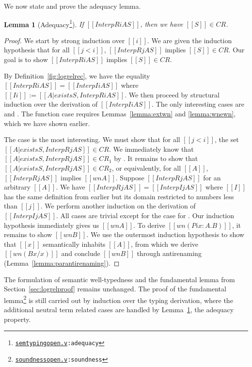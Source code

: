 \documentclass[\ifpublic nolinenum\else\fi,online,OA]{jfp}
\newcommand{\dotv}[2]{\href{#1}{\texttt{#1}}{\texttt{:#2}}}
\newtheorem{lemma}[theorem]{Lemma}
\theoremstyle{definition}
\begin{document}
We now state and prove the adequacy lemma.
\begin{lemma}[Adequacy\footnote{\dotv{semtypingopen.v}{adequacy}}]
  \label{lemma:adequacy}
  If $[[InterpR i A S]]$, then we have $[[S]] \in CR$.
\end{lemma}
\begin{proof}
  We start by strong induction over $[[i]]$. We are given the
  induction hypothesis that for all $[[j < i]]$, $[[InterpR j A S]]$
  implies $[[S]] \in CR$. Our goal is to show $[[InterpR i A S]]$
  implies $[[S]] \in CR$.

  By Definition~\ref{fig:logrelrec}, we have the
  equality $[[InterpR i A S]] = [[Interp I i A S]]$  where $[[I i]] :=
  [[{A | exists S , InterpR i A S}]]$.
  We then proceed by structural induction over the derivation of $[[Interp I i A
  S]]$. The only interesting cases are  and .
  The function case requires Lemmas~\ref{lemma:extwn} and
  \ref{lemma:wnewn}, which we have shown earlier.

  The  case is the most interesting. We must show that
  for all $[[j < i]]$, the set $[[{ A | exists S, InterpR j A S  }]]
  \in CR$. We immediately know that $[[{A | exists S, InterpR j A S
  }]] \in CR_1$ by . It remains to show that $[[{A | exists S, InterpR j A S
  }]] \in CR_2$, or equivalently, for all $[[A]]$, $[[InterpR j A S]]$
  implies $[[wn A]]$. Suppose $[[InterpR j A S]]$ for an arbitrary
  $[[A]]$. We have $[[InterpR j A S]]=[[Interp I j A S]]$ where $[[I]]$
  has the same definition from earlier but its domain restricted to
  numbers less than $[[j]]$. We perform another induction on
  the derivation of $[[Interp I j A S]]$. All cases are trivial except for the case for
  . Our induction hypothesis immediately gives us $[[wn
  A]]$. To derive $[[wn (Pi x : A . B)]]$, it remains to show $[[wn B]]$. We
  use the outermost induction hypothesis to show that $[[x]]$
  semantically inhabits $[[A]]$, from which we derive $[[wn (B {x / x})]]$
  and conclude $[[wn B]]$ through antirenaming (Lemma~\ref{lemma:parantirenaming}).
\end{proof}

The formulation of semantic well-typedness and the fundamental lemma from
Section~\ref{sec:logrelproof} remains
unchanged.
The proof of the fundamental lemma\footnote{\dotv{soundnessopen.v}{soundness}} is still carried out by induction
over the typing derivation, where the additional neutral term related
cases are handled by Lemma~\ref{lemma:adequacy}, the adequacy property.
\end{document}
